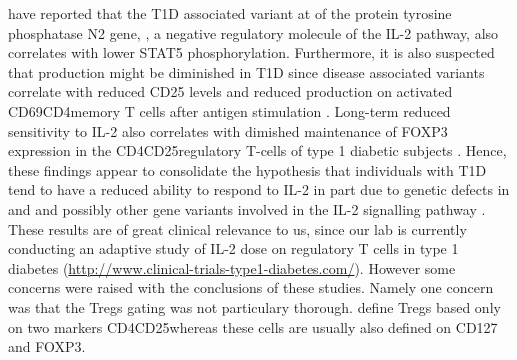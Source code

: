 \citet{Long:2011hk} have reported that the \Gls{T1D} associated variant at 
of the protein tyrosine phosphatase N2 gene, , a negative regulatory molecule of the IL-2 pathway,
also correlates with lower STAT5 phosphorylation.
Furthermore, it is also suspected that  production might be diminished in T1D since disease associated  variants 
correlate with reduced CD25 levels 
and reduced  production
on activated CD69\positive CD4\positive memory T cells
after antigen stimulation \citep{Dendrou:2009dv}.
Long-term reduced sensitivity to IL-2 also correlates with dimished maintenance 
of FOXP3 expression in the CD4\positive CD25\positive regulatory T-cells of type 1 diabetic subjects \citep{Long:2010ej}.
Hence, these findings appear to consolidate the hypothesis that individuals with T1D tend to have a reduced ability to respond to IL-2
in part due to genetic defects in  and  and possibly other gene variants involved in the IL-2 signalling pathway
\citet{Long:2010ej,Long:2011hk,Long:2012ea}.
These results are of great clinical relevance to us,
since our lab is currently conducting an
adaptive study of IL-2 dose on regulatory T cells in type 1 diabetes (\url{http://www.clinical-trials-type1-diabetes.com/}).
However some concerns were raised with the conclusions of these studies.
Namely one concern was that the Tregs gating was not particulary thorough.
\citet{Long:2010ej} define Tregs based only on two markers CD4\positive CD25\positive whereas these cells are usually
also defined on CD127 and FOXP3.
